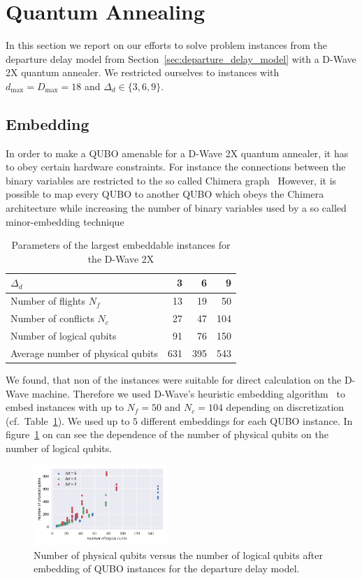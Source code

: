 \section{Quantum Annealing}
In this section we report on our efforts to solve problem instances from the departure delay model from Section~\ref{sec:departure_delay_model} with a D-Wave 2X quantum annealer.
We restricted ourselves to instances with $d_\text{max}=D_\text{max}=18$ and $\Delta_d \in \{3, 6, 9\}$.
\subsection{Embedding}
In order to make a QUBO amenable for a D-Wave 2X quantum annealer, it has to obey certain hardware constraints.
For instance the connections between the binary variables are restricted to the so called Chimera graph~\cite{Rieffel2015}
However, it is possible to map every QUBO to another QUBO which obeys the Chimera architecture while increasing the number of binary variables used by a so called minor-embedding technique~\cite{choi}

\begin{table}[h]
    \begin{tabular}{lrrr}
    \toprule
    $\Delta_d$ &    3 &    6 &    9 \\
    \midrule
    Number of flights $N_f$   &   13 &   19 &   50 \\
    Number of conflicts $N_c$ &   27 &   47 &  104 \\
    Number of logical qubits  &   91 &   76 &  150 \\
    Average number of physical qubits &  631 &  395 &  543 \\
    \bottomrule
    \end{tabular}
    \caption{Parameters of the largest embeddable instances for the D-Wave 2X}
\label{tab:embedding}
\end{table}

We found, that non of the instances were suitable for direct calculation on the D-Wave machine.
Therefore we used D-Wave's heuristic embedding algorithm~\cite{DWaveEmbeddingHeuristic} to embed instances with up to $N_f=50$ and $N_c=104$ depending on discretization (cf.\ Table~\ref{tab:embedding}).
We used up to $5$ different embeddings for each QUBO instance.
In figure~\ref{fig:number_of_physical_qubits} on can see the dependence of the number of physical qubits on the number of logical qubits.


\begin{figure}[htpb]
    \centering
    \includegraphics[width=0.45\textwidth]{./pics/physicalVsLogicalNumberOfQubits.pdf}
    \caption{Number of physical qubits versus the number of logical qubits after embedding of QUBO instances for the departure delay model.}
\label{fig:number_of_physical_qubits}
\end{figure}




